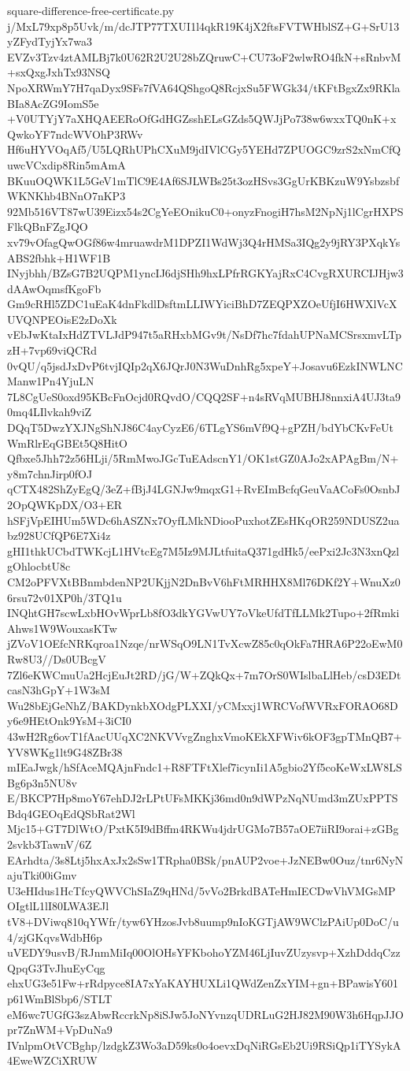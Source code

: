 \documentclass[11pt]{article}
\theoremstyle{definition}
\theoremstyle{remark}
\begin{document}
\begin{filecontents*}[overwrite]{square-difference-free-certificate.py}
j/MxL79xp8p5Uvk/m/dcJTP77TXUI1l4qkR19K4jX2ftsFVTWHblSZ+G+SrU13yZFydTyjYx7wa3
EVZv3Tzv4ztAMLBj7k0U62R2U2U28bZQruwC+CU73oF2wlwRO4fkN+sRnbvM+sxQxgJxhTx93NSQ
NpoXRWmY7H7qaDyx9SFs7fVA64QShgoQ8RcjxSu5FWGk34/tKFtBgxZx9RKlaBIa8AcZG9IomS5e
+V0UTYjY7aXHQAEERoOfGdHGZsshELsGZds5QWJjPo738w6wxxTQ0nK+xQwkoYF7ndcWVOhP3RWv
Hf6uHYVOqAf5/U5LQRhUPhCXuM9jdIVlCGy5YEHd7ZPUOGC9zrS2xNmCfQuwcVCxdip8Rin5mAmA
BKuuOQWK1L5GeV1mTlC9E4Af6SJLWBs25t3ozHSvs3GgUrKBKzuW9YsbzsbfWKNKhb4BNnO7nKP3
92Mb516VT87wU39Eizx54s2CgYeEOnikuC0+onyzFnogiH7hsM2NpNj1lCgrHXPSFlkQBnFZgJQO
xv79vOfagQwOGf86w4mruawdrM1DPZI1WdWj3Q4rHMSa3IQg2y9jRY3PXqkYsABS2fbhk+H1WF1B
INyjbhh/BZsG7B2UQPM1yncIJ6djSHh9hxLPfrRGKYajRxC4CvgRXURCIJHjw3dAAwOqmsfKgoFb
Gm9cRHl5ZDC1uEaK4dnFkdlDsftmLLIWYiciBhD7ZEQPXZOeUfjI6HWXlVcXUVQNPEOisE2zDoXk
vEbJwKtaIxHdZTVLJdP947t5aRHxbMGv9t/NsDf7hc7fdahUPNaMCSrsxmvLTpzH+7vp69viQCRd
0vQU/q5jsdJxDvP6tvjIQIp2qX6JQrJ0N3WuDnhRg5xpeY+Josavu6EzkINWLNCManw1Pn4YjuLN
7L8CgUeS0oxd95KBcFnOcjd0RQvdO/CQQ2SF+n4sRVqMUBHJ8nnxiA4UJ3ta90mq4LIlvkah9viZ
DQqT5DwzYXJNgShNJ86C4ayCyzE6/6TLgYS6mVf9Q+gPZH/bdYbCKvFeUtWmRlrEqGBEt5Q8HitO
Qfbxe5Jhh72z56HLji/5RmMwoJGcTuEAdscnY1/OK1stGZ0AJo2xAPAgBm/N+y8m7chnJirp0fOJ
qCTX482ShZyEgQ/3eZ+fBjJ4LGNJw9mqxG1+RvEImBcfqGeuVaACoFs0OsnbJ2OpQWKpDX/O3+ER
hSFjVpEIHUm5WDc6hASZNx7OyfLMkNDiooPuxhotZEsHKqOR259NDUSZ2uabz928UCfQP6E7Xi4z
gHI1thkUCbdTWKcjL1HVtcEg7M5Iz9MJLtfuitaQ371gdHk5/eePxi2Jc3N3xnQzlgOhlocbtU8c
CM2oPFVXtBBnmbdenNP2UKjjN2DnBvV6hFtMRHHX8Ml76DKf2Y+WnuXz06rsu72v01XP0h/3TQ1u
INQhtGH7scwLxbHOvWprLb8fO3dkYGVwUY7oVkeUfdTfLLMk2Tupo+2fRmkiAhws1W9WouxasKTw
jZVoV1OEfcNRKqroa1Nzqe/nrWSqO9LN1TvXcwZ85c0qOkFa7HRA6P22oEwM0Rw8U3//Ds0UBcgV
7Zl6eKWCmuUa2HcjEuJt2RD/jG/W+ZQkQx+7m7OrS0WIslbaLlHeb/csD3EDtcasN3hGpY+1W3sM
Wu28bEjGeNhZ/BAKDynkbXOdgPLXXI/yCMxxj1WRCVofWVRxFORAO68Dy6e9HEtOnk9YsM+3iCI0
43wH2Rg6ovT1fAacUUqXC2NKVVvgZnghxVmoKEkXFWiv6kOF3gpTMnQB7+YV8WKg1lt9G48ZBr38
mIEaJwgk/hSfAceMQAjnFndc1+R8FTFtXlef7icynIi1A5gbio2Yf5coKeWxLW8LSBg6p3n5NU8v
E/BKCP7Hp8moY67ehDJ2rLPtUFsMKKj36md0n9dWPzNqNUmd3mZUxPPTSBdq4GEOqEdQSbRat2Wl
Mjc15+GT7DlWtO/PxtK5I9dBffm4RKWu4jdrUGMo7B57aOE7iiRI9orai+zGBg2svkb3TawnV/6Z
EArhdta/3s8Ltj5hxAxJx2sSw1TRpha0BSk/pnAUP2voe+JzNEBw0Ouz/tnr6NyNajuTki00iGmv
U3eHIdus1HcTfcyQWVChSIaZ9qHNd/5vVo2BrkdBATeHmIECDwVhVMGsMPOIgtlL1lI80LWA3EJl
tV8+DViwq810qYWfr/tyw6YHzosJvb8uump9nIoKGTjAW9WClzPAiUp0DoC/u4/zjGKqvsWdbH6p
uVEDY9usvB/RJnmMiIq00OlOHsYFKbohoYZM46LjIuvZUzysvp+XzhDddqCzzQpqG3TvJhuEyCqg
ehxUG3e51Fw+rRdpyce8IA7xYaKAYHUXLi1QWdZenZxYIM+gn+BPawisY601p61WmBlSbp6/STLT
eM6wc7UGfG3szAbwRccrkNp8iSJw5JoNYvnzqUDRLuG2HJ82M90W3h6HqpJJOpr7ZnWM+VpDuNa9
IVnlpmOtVCBghp/lzdgkZ3Wo3aD59ks0o4oevxDqNiRGsEb2Ui9RSiQp1iTYSykA4EweWZCiXRUW

\end{filecontents*}
\end{document}
